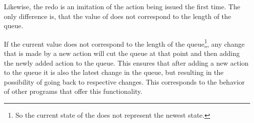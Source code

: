 Likewise, the redo is an imitation of the action being issued the first time.
The only difference is, that the value of  does not correspond to the length of the queue.

If the current  value does not correspond to the length of the queue\footnote{So the current state of the  does not represent the newest state.}, any change that is made by a new action will cut the queue at that point and then adding the newly added action to the queue.
This ensures that after adding a new action to the queue it is also the latest change in the queue, but resulting in the possibility of going back to respective changes.
This corresponds to the behavior of other programs that offer this functionality.

